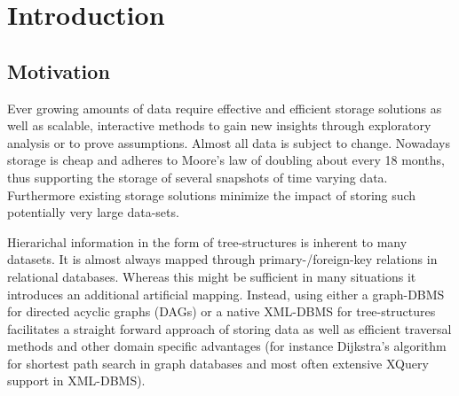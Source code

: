 \section{Introduction}\label{sec::introduction}
\subsection{Motivation}
Ever growing amounts of data require effective and efficient storage solutions as well as scalable, interactive methods to gain new insights through exploratory analysis or to prove assumptions. Almost all data is subject to change. Nowadays storage is cheap and adheres to Moore's law\cite{MOORE} of doubling about every 18 months, thus supporting the storage of several snapshots of time varying data. Furthermore existing storage solutions minimize the impact of storing such potentially very large data-sets.

Hierarichal information in the form of tree-structures is inherent to many datasets. It is almost always mapped through primary-/foreign-key relations in relational databases. Whereas this might be sufficient in many situations it introduces an additional artificial mapping. Instead, using either a graph-DBMS for directed acyclic graphs (DAGs) or a native XML-DBMS for tree-structures facilitates a straight forward approach of storing data as well as efficient traversal methods and other domain specific advantages (for instance Dijkstra's algorithm for shortest path search in graph databases and most often extensive XQuery support in XML-DBMS).

